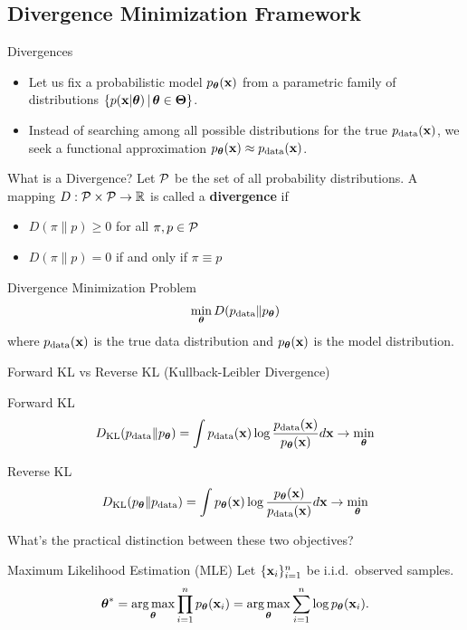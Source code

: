 \documentclass{beamer}
\begin{document}
\subsection{Divergence Minimization Framework}
\begin{frame}{Divergences}
	\begin{itemize}
	\item Let us fix a probabilistic model $p_{\boldsymbol{\theta}}(\mathbf{x})$ from a parametric family of distributions $\{p(\mathbf{x} | \boldsymbol{\theta}) \, | \, \boldsymbol{\theta} \in \boldsymbol{\Theta}\}$.\\
        \eqpause
	\item Instead of searching among all possible distributions for the true $p_{\text{data}}(\mathbf{x})$, we seek a functional approximation $p_{\boldsymbol{\theta}}(\mathbf{x}) \approx p_{\text{data}}(\mathbf{x})$.
	\end{itemize}
    \eqpause
	\begin{block}{What is a Divergence?}
		Let $\mathcal{P}$ be the set of all probability distributions. A mapping $D: \mathcal{P} \times \mathcal{P} \to \mathbb{R}$ is called a \textbf{divergence} if 
		\begin{itemize}
			\item $D(\pi \| p) \geq 0$ for all $\pi, p \in \mathcal{P}$
			\item $D(\pi \| p) = 0$ if and only if $\pi \equiv p$
		\end{itemize}
	\end{block}
    \eqpause
	\begin{block}{Divergence Minimization Problem}
		\vspace{-0.3cm}
		$$
		\min_{\boldsymbol{\theta}} D(p_{\text{data}} \| p_{\boldsymbol{\theta}})
		$$
		where $p_{\text{data}}(\mathbf{x})$ is the true data distribution and $p_{\boldsymbol{\theta}}(\mathbf{x})$ is the model distribution.
	\end{block}
\end{frame}
\begin{frame}{Forward KL vs Reverse KL (Kullback-Leibler Divergence)}
	\begin{block}{Forward KL}
		\vspace{-0.2cm}
		\[
			D_\mathrm{KL}(p_{\text{data}} \| p_{\boldsymbol{\theta}}) = \int p_{\text{data}}(\mathbf{x}) \log \frac{p_{\text{data}}(\mathbf{x})}{p_{\boldsymbol{\theta}}(\mathbf{x})} d \mathbf{x} \rightarrow \min_{\boldsymbol{\theta}}
		\]
	\end{block}
    \eqpause
	\begin{block}{Reverse KL}
		\vspace{-0.2cm}
		\[
			D_\mathrm{KL}(p_{\boldsymbol{\theta}} \| p_{\text{data}}) = \int p_{\boldsymbol{\theta}}(\mathbf{x}) \log \frac{p_{\boldsymbol{\theta}}(\mathbf{x})}{p_{\text{data}}(\mathbf{x})} d \mathbf{x} \rightarrow \min_{\boldsymbol{\theta}}
		\]
	\end{block}
    \eqpause
	What's the practical distinction between these two objectives?
    \eqpause
	\begin{block}{Maximum Likelihood Estimation (MLE)}
	Let $\{\mathbf{x}_i\}_{i=1}^n$ be i.i.d.\ observed samples.
		\vspace{-0.3cm}
		\[
			\boldsymbol{\theta}^* = \operatorname*{arg\,max}_{\boldsymbol{\theta}} \prod_{i=1}^n p_{\boldsymbol{\theta}}(\mathbf{x}_i) = \operatorname*{arg\,max}_{\boldsymbol{\theta}} \sum_{i=1}^n \log p_{\boldsymbol{\theta}}(\mathbf{x}_i).
		\]
	\end{block}
\end{frame}
\end{document}
